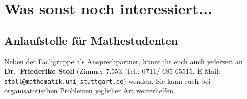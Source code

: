 \newpage
\section{Was sonst noch interessiert...}

\subsection{Anlaufstelle für Mathestudenten}

Neben der Fachgruppe als Ansprechpartner,
könnt ihr euch auch jederzeit an {\bf Dr.~Friederike Stoll}
(Zimmer 7.553, Tel.: 0711/ 685-65515,
E-Mail: {\tt stoll@mathematik.uni-stuttgart.de}) wenden.
Sie kann euch bei organisatorischen Problemen jeglicher Art weiterhelfen.

